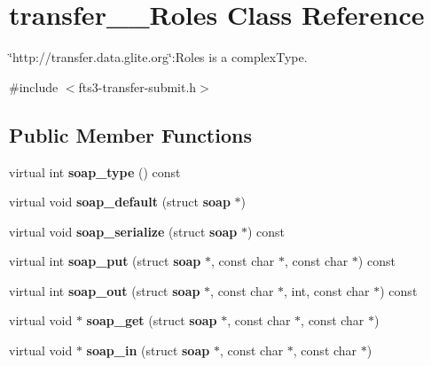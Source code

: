 \section{transfer\_\-\_\-Roles Class Reference}
\label{classtransfer____Roles}


\char`\"{}http://transfer.data.glite.org\char`\"{}:Roles is a complexType.  




{\ttfamily \#include $<$fts3-\/transfer-\/submit.h$>$}

\subsection*{Public Member Functions}
\begin{DoxyCompactItemize}
\item 
virtual int {\bfseries soap\_\-type} () const \label{classtransfer____Roles_a3f104a1a66ac503475d31a0a1643d568}

\item 
virtual void {\bfseries soap\_\-default} (struct {\bf soap} $\ast$)\label{classtransfer____Roles_aaad479027cb447922d987270c3356f78}

\item 
virtual void {\bfseries soap\_\-serialize} (struct {\bf soap} $\ast$) const \label{classtransfer____Roles_a3ade19c069d36a9ace4f2cb37cb71efe}

\item 
virtual int {\bfseries soap\_\-put} (struct {\bf soap} $\ast$, const char $\ast$, const char $\ast$) const \label{classtransfer____Roles_a58d2312091b5fec3f28bf83bcaac44ba}

\item 
virtual int {\bfseries soap\_\-out} (struct {\bf soap} $\ast$, const char $\ast$, int, const char $\ast$) const \label{classtransfer____Roles_a1ca1bcdb68b513d50d22b5298b30d54a}

\item 
virtual void $\ast$ {\bfseries soap\_\-get} (struct {\bf soap} $\ast$, const char $\ast$, const char $\ast$)\label{classtransfer____Roles_a270e9e9a2ada3f3cf2caa56a0df29bac}

\item 
virtual void $\ast$ {\bfseries soap\_\-in} (struct {\bf soap} $\ast$, const char $\ast$, const char $\ast$)\label{classtransfer____Roles_a1d4f0f1909403301e0479fffa17f2b6e}

\end{DoxyCompactItemize}
